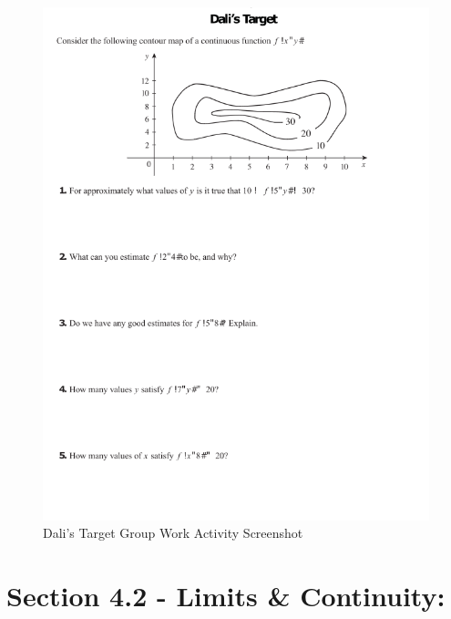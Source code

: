 \begin{figure}[!hp]
\includegraphics[]{Dalis-Target.png}
\caption{Dali's Target Group Work Activity Screenshot}
\label{fig:dali}
\end{figure}

\section*{Section 4.2 - Limits \& Continuity:}


